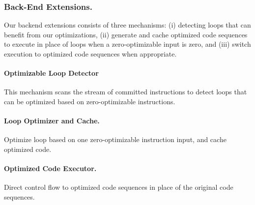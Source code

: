  
 \subsubsection{Back-End Extensions.}
 Our backend extensions consists of three mechanisms: (i) detecting loops that can benefit from our optimizations, (ii) generate and cache optimized code sequences to execute in place of loops when a zero-optimizable input is zero, and (iii) switch execution to optimized code  sequences when appropriate. 
 
\paragraph{Optimizable Loop Detector} This mechanism scans the stream of committed instructions to detect loops that can be optimized based on zero-optimizable instructions. 
 
\paragraph{Loop Optimizer and Cache.}  Optimize loop based on one zero-optimizable instruction input, and cache optimized code. 
 
 \paragraph{Optimized Code Executor.} Direct control flow to optimized code sequences in place of the original code sequences.   
 
 
